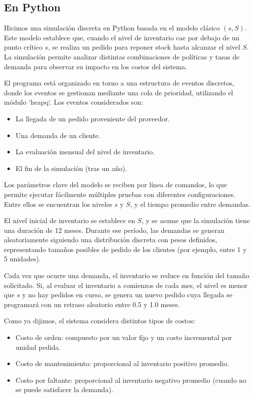 \documentclass{article}
\begin{document}
\subsection{En Python}
Hicimos una simulación discreta en Python basada en el modelo clásico \((s, S)\). Este modelo establece que, cuando el nivel de inventario cae por debajo de un punto crítico \( s \), se realiza un pedido para reponer stock hasta alcanzar el nivel \( S \). La simulación permite analizar distintas combinaciones de políticas y tasas de demanda para observar su impacto en los costos del sistema.

El programa está organizado en torno a una estructura de eventos discretos, donde los eventos se gestionan mediante una cola de prioridad, utilizando el módulo `heapq`. Los eventos considerados son:

\begin{itemize}
    \item La llegada de un pedido proveniente del proveedor.
    \item Una demanda de un cliente.
    \item La evaluación mensual del nivel de inventario.
    \item El fin de la simulación (tras un año).
\end{itemize} 

Los parámetros clave del modelo se reciben por línea de comandos, lo que permite ejecutar fácilmente múltiples pruebas con diferentes configuraciones. Entre ellos se encuentran los niveles \( s \) y \( S \), y el tiempo promedio entre demandas.

El nivel inicial de inventario se establece en \( S \), y se asume que la simulación tiene una duración de 12 meses. Durante ese período, las demandas se generan aleatoriamente siguiendo una distribución discreta con pesos definidos, representando tamaños posibles de pedido de los clientes (por ejemplo, entre 1 y 5 unidades).

Cada vez que ocurre una demanda, el inventario se reduce en función del tamaño solicitado. Si, al evaluar el inventario a comienzos de cada mes, el nivel es menor que \( s \) y no hay pedidos en curso, se genera un nuevo pedido cuya llegada se programará con un retraso aleatorio entre 0.5 y 1.0 meses.

Como ya dijimos, el sistema considera distintos tipos de costos:

\begin{itemize}
    \item Costo de orden: compuesto por un valor fijo y un costo incremental por unidad pedida.
    \item Costo de mantenimiento: proporcional al inventario positivo promedio.
    \item Costo por faltante: proporcional al inventario negativo promedio (cuando no se puede satisfacer la demanda).
\end{itemize}
\end{document}
